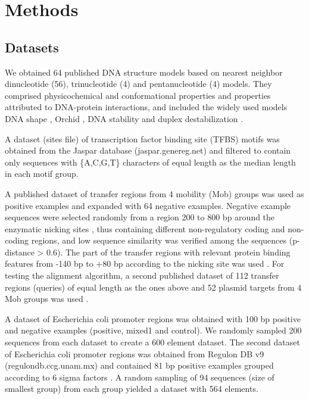 \documentclass[sigconf]{acmart}
\begin{document}
\section{Methods}
\subsection{Datasets}
We obtained 64 published DNA structure models \cite{Zrimec2020-wx} based on nearest neighbor dinucleotide (56), trinucleotide (4) and pentanucleotide (4) models. They comprised physicochemical and conformational properties and properties attributed to DNA-protein interactions, and included the widely used models DNA shape \cite{Rohs2009-hm}, Orchid \cite{Bishop2011-jm}, DNA stability and duplex destabilization \cite{Zrimec2015-xf}. 

A dataset (sites file) of transcription factor binding site (TFBS) motifs was obtained from the Jaspar database (jaspar.genereg.net) and filtered to contain only sequences with \{A,C,G,T\} characters of equal length as the median length in each motif group.

A published dataset of transfer regions from 4 mobility (Mob) groups \cite{Zrimec2018-lx} was used as positive examples and expanded with 64 negative examples. Negative example sequences were selected randomly from a region 200 to 800 bp around the enzymatic nicking sites \cite{Zrimec2018-lx}, thus containing different non-regulatory coding and non-coding regions, and low sequence similarity was verified among the sequences (p-distance > 0.6). The part of the transfer regions with relevant protein binding features from -140 bp to +80 bp according to the nicking site was used \cite{Zrimec2018-lx}. For testing the alignment algorithm, a second published dataset of 112 transfer regions (queries) of equal length as the ones above and 52 plasmid targets from 4 Mob groups was used \cite{Zrimec2020-wx}.

A dataset of Escherichia coli promoter regions was obtained \cite{Gusmao2014-hp} with 100 bp positive and negative examples (positive, mixed1 and control). We randomly sampled 200 sequences from each dataset to create a 600 element dataset. The second dataset of Escherichia coli promoter regions was obtained from Regulon DB v9 (regulondb.ccg.unam.mx) and contained 81 bp positive examples grouped according to 6 sigma factors \cite{Watson2008-dt}. A random sampling of 94 sequences (size of smallest group) from each group yielded a dataset with 564 elements.
\end{document}
